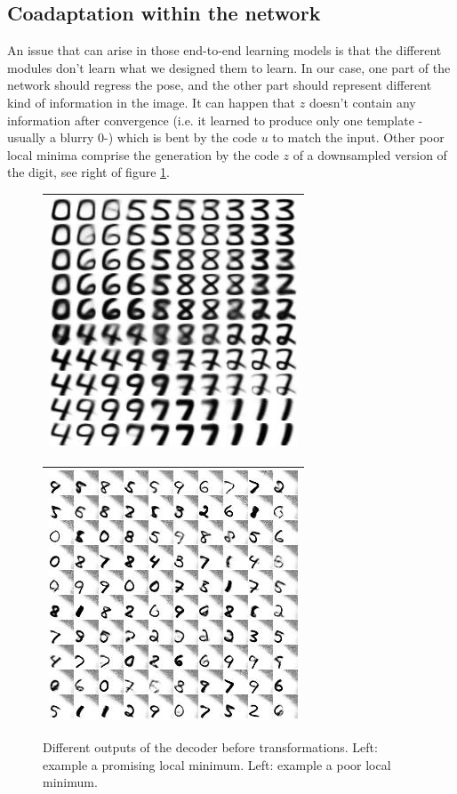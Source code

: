 \documentclass[letterpaper, twoside]{article}
\begin{document}
\subsection{Coadaptation within the network}
  An issue that can arise in those end-to-end learning models is that the different modules don't learn what we designed them to learn. In our case, one part of the network should regress the pose, and the other part should represent different kind of information in the image. It can happen that $z$ doesn't contain any information after convergence (i.e. it learned to produce only one template -usually a blurry 0-) which is bent by the code $u$ to match the input. Other poor local minima comprise the generation by the code $z$ of a downsampled version of the digit, see right of figure \ref{locmin}.

  \begin{figure}[h]
  \centering
  \begin{minipage}{.33\textwidth}
  \begin{tabular}{|@{}c@{}|}\hline
  \includegraphics[scale=1]{manifold_good_min.jpg}\\ \hline
  \end{tabular}
  \end{minipage}%
  \begin{minipage}{.33\textwidth}
  \begin{tabular}{|@{}c@{}|}\hline
  \includegraphics[scale=1]{manifold_bad_min.jpg}\\\hline
  \end{tabular}
  \end{minipage}%
  \caption{Different outputs of the decoder before transformations. Left: example a promising local minimum. Left: example a poor local minimum.}
  \label{locmin}
  \end{figure}
\end{document}
